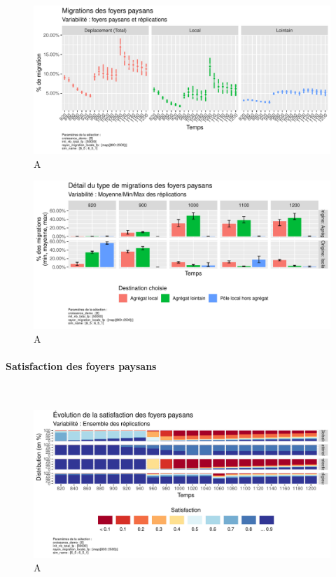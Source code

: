 \begin{figure}[H]
	\centering
	\includegraphics[width=\linewidth]{img/results_6_5_1/FP_TypeDeplacements_Haut.pdf}
	\caption{A}
	\label{}
\end{figure}
\begin{figure}[H]
	\centering
	\includegraphics[width=\linewidth]{img/results_6_5_1/FP_DeplacementsDetail_Haut.pdf}
	\caption{A}
	\label{}
\end{figure}


\paragraph{Satisfaction des foyers paysans}~\\

\begin{figure}[H]
	\centering
	\includegraphics[width=\linewidth]{img/results_6_5_1/FP_Satisfaction_Haut.pdf}
	\caption{A}
	\label{}
\end{figure}
